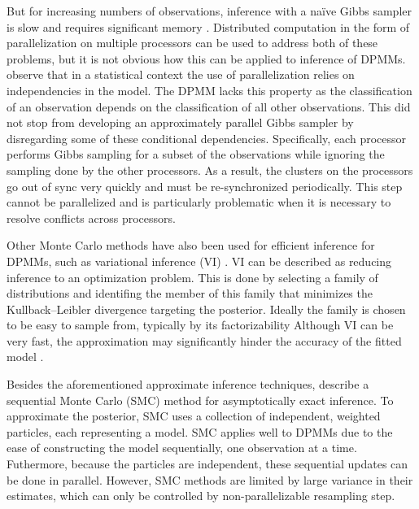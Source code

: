 \documentclass{uwstat572}
\begin{document}
But for increasing numbers of observations, inference with a na\"ive Gibbs sampler is slow and requires significant memory \citep{WDX13}.
Distributed computation in the form of parallelization on multiple processors can be used to address both of these problems, but it is not obvious how this can be applied to inference of DPMMs.
\citet{WDX13} observe that in a statistical context the use of parallelization relies on independencies in the model.
The DPMM lacks this property as the classification of an observation depends on the classification of all other observations.
This did not stop \citet{ASW08} from developing an approximately parallel Gibbs sampler by disregarding some of these conditional dependencies.
Specifically, each processor performs Gibbs sampling for a subset of the observations while ignoring the sampling done by the other processors.
As a result, the clusters on the processors go out of sync very quickly and must be re-synchronized periodically.
This step cannot be parallelized and is particularly problematic when it is necessary to resolve conflicts across processors.

Other Monte Carlo methods have also been used for efficient inference for DPMMs, such as variational inference (VI) \citep{BJ06,TKW07}.
VI can be described as reducing inference to an optimization problem.
This is done by selecting a family of distributions and identifing the member of this family that minimizes the Kullback--Leibler divergence targeting the posterior.
Ideally the family is chosen to be easy to sample from, typically by its factorizability
Although VI can be very fast, the approximation may significantly hinder the accuracy of the fitted model \citep{WDX13}.

Besides the aforementioned approximate inference techniques, \citet{UBC10} describe a sequential Monte Carlo (SMC) method for asymptotically exact inference.
To approximate the posterior, SMC uses a collection of independent, weighted particles, each representing a model.
SMC applies well to DPMMs due to the ease of constructing the model sequentially, one observation at a time.
Futhermore, because the particles are independent, these sequential updates can be done in parallel.
However, SMC methods are limited by large variance in their estimates, which can only be controlled by non-parallelizable resampling step.
\end{document}

